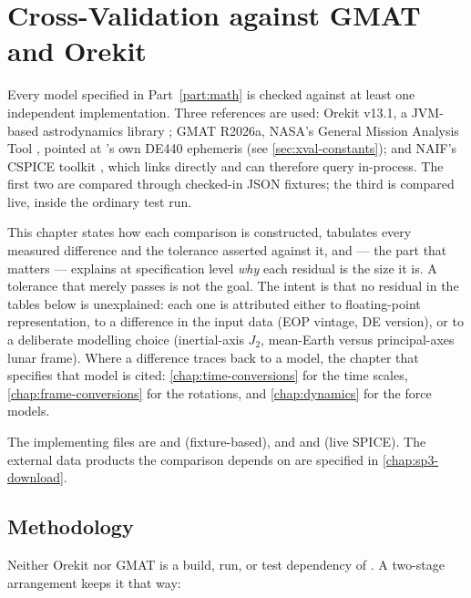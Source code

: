 \chapter{Cross-Validation against GMAT and Orekit}
\label{chap:cross-validation}

Every model specified in Part~\ref{part:math} is checked against at least one
independent implementation. Three references are used: Orekit v13.1, a
JVM-based astrodynamics library \citep{orekit2025}; GMAT R2026a,
NASA's General Mission Analysis Tool \citep{gmat2023}, pointed at \lupnt{}'s own
DE440 ephemeris (see \cref{sec:xval-constants}); and NAIF's CSPICE
toolkit \citep{acton1996spice}, which \lupnt{} links directly and can
therefore query in-process. The first two are compared through checked-in JSON
fixtures; the third is compared live, inside the ordinary test run.

This chapter states how each comparison is constructed, tabulates every
measured difference and the tolerance asserted against it, and --- the part
that matters --- explains at specification level \emph{why} each residual is
the size it is. A tolerance that merely passes is not the goal. The intent is
that no residual in the tables below is unexplained: each one is attributed
either to floating-point representation, to a difference in the input data
(EOP vintage, DE version), or to a deliberate modelling choice
(inertial-axis $J_2$, mean-Earth versus principal-axes lunar frame). Where a
difference traces back to a model, the chapter that specifies that model is
cited: \cref{chap:time-conversions} for the time scales,
\cref{chap:frame-conversions} for the rotations, and \cref{chap:dynamics} for
the force models.

The implementing files are  and 
(fixture-based), and  and
 (live SPICE). The
external data products the comparison depends on are specified in
\cref{chap:sp3-download}.

\section{Methodology}
\label{sec:xval-method}

Neither Orekit nor GMAT is a build, run, or test dependency of \lupnt{}.
A two-stage arrangement keeps it that way:

